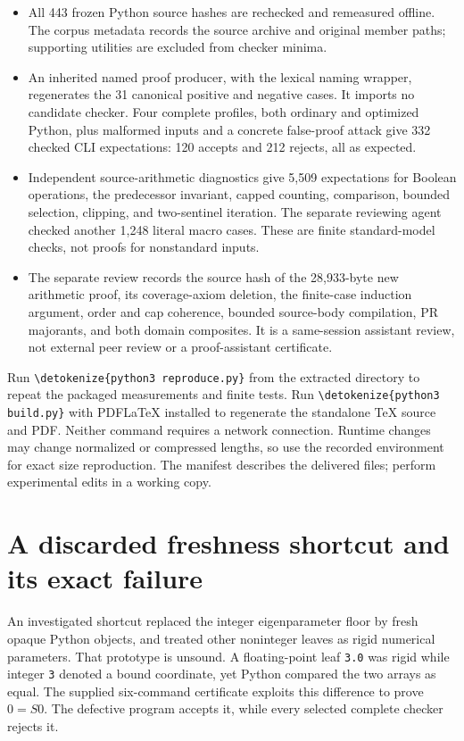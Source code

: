 \documentclass[11pt,letterpaper]{article}
\theoremstyle{definition}\newtheorem{definition}[theorem]{Definition}
\theoremstyle{remark}\newtheorem{remark}[theorem]{Remark}
\newcommand{\file}[1]{\expandafter\nolinkurl\expandafter{\detokenize{#1}}}
\begin{document}
\begin{itemize}
\item All 443 frozen Python source hashes are rechecked and remeasured
offline. The corpus metadata records the source archive and original
member paths; supporting utilities are excluded from checker minima.
\item An inherited named proof producer, with the lexical naming wrapper,
regenerates the 31 canonical positive and negative cases. It imports no
candidate checker. Four complete profiles, both ordinary and optimized
Python, plus malformed inputs and a concrete false-proof attack give
332 checked CLI expectations: 120 accepts and 212 rejects, all as expected.
\item Independent source-arithmetic diagnostics give 5,509 expectations
for Boolean operations, the predecessor invariant, capped counting,
comparison, bounded selection, clipping, and two-sentinel iteration.
The separate reviewing agent checked another 1,248 literal macro cases.
These are finite standard-model checks, not proofs for nonstandard inputs.
\item The separate review records the source hash of the 28,933-byte new
arithmetic proof, its coverage-axiom deletion, the finite-case induction
argument, order and cap coherence, bounded source-body compilation, PR
majorants, and both domain composites. It is a same-session assistant
review, not external peer review or a proof-assistant certificate.
\end{itemize}

Run \file{python3 reproduce.py} from the extracted directory to repeat the
packaged measurements and finite tests. Run \file{python3 build.py} with
PDFLaTeX installed to regenerate the standalone TeX source and PDF.
Neither command requires a network connection. Runtime changes may
change normalized or compressed lengths, so use the recorded environment
for exact size reproduction. The manifest describes the delivered files;
perform experimental edits in a working copy.

\section{A discarded freshness shortcut and its exact failure}
An investigated shortcut replaced the integer eigenparameter floor by
fresh opaque Python objects, and treated other noninteger leaves as
rigid numerical parameters. That prototype is unsound. A floating-point
leaf \texttt{3.0} was rigid while integer \texttt{3} denoted a bound
coordinate, yet Python compared the two arrays as equal. The supplied
six-command certificate exploits this difference to prove $0=S0$.
The defective program accepts it, while every selected complete checker
rejects it.
\end{document}
